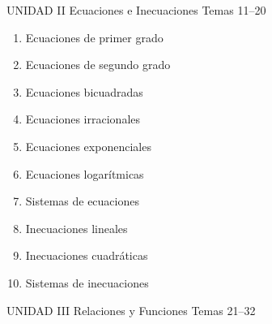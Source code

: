 \vspace{0.4cm}

\begin{tcolorbox}[
    enhanced,
    colback   = AzulMedio,
    colframe  = DoradoAcadémico,
    arc = 3pt, boxrule = 1pt,
    left = 8pt, right = 8pt, top = 5pt, bottom = 5pt,
    fontupper = \sffamily\bfseries\color{white}
  ]
  UNIDAD II \hfill Ecuaciones e Inecuaciones \hfill Temas 11–20
\end{tcolorbox}

\begin{multicols}{2}
  \begin{enumerate}[label=\textcolor{AzulMedio}{\textbf{\arabic*.}},
      leftmargin=2em, itemsep=1pt, start=11]
    \item Ecuaciones de primer grado
    \item Ecuaciones de segundo grado
    \item Ecuaciones bicuadradas
    \item Ecuaciones irracionales
    \item Ecuaciones exponenciales
    \item Ecuaciones logarítmicas
    \item Sistemas de ecuaciones
    \item Inecuaciones lineales
    \item Inecuaciones cuadráticas
    \item Sistemas de inecuaciones
  \end{enumerate}
\end{multicols}

\vspace{0.4cm}

\begin{tcolorbox}[
    enhanced,
    colback   = AzulPizarra,
    colframe  = DoradoAcadémico,
    arc = 3pt, boxrule = 1pt,
    left = 8pt, right = 8pt, top = 5pt, bottom = 5pt,
    fontupper = \sffamily\bfseries\color{white}
  ]
  UNIDAD III \hfill Relaciones y Funciones \hfill Temas 21–32
\end{tcolorbox}


